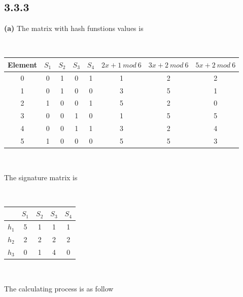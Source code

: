 \documentclass[a4paper, 11pt]{article}
\begin{document}
\subsection*{3.3.3}

\textbf{(a)} The matrix with hash funstions values is

\

\begin{tabular}{c|c|c|c|c|c|c|c} 
Element & $S_1$ & $S_2$ & $S_3$ & $S_4$ & $2x + 1 \ mod \ 6$ & $3x + 2 \ mod \ 6$ & $5x + 2 \ mod \ 6$ \\ 
\hline 
0 & 0 & 1 & 0 & 1 & 1 & 2 & 2 \\ 
1 & 0 & 1 & 0 & 0 & 3 & 5 & 1 \\ 
2 & 1 & 0 & 0 & 1 & 5 & 2 & 0 \\ 
3 & 0 & 0 & 1 & 0 & 1 & 5 & 5 \\ 
4 & 0 & 0 & 1 & 1 & 3 & 2 & 4 \\ 
5 & 1 & 0 & 0 & 0 & 5 & 5 & 3 \\
\end{tabular} 

\

The signature matrix is

\

\begin{tabular}{c|c|c|c|c} 
\ & $S_1$ & $S_2$ & $S_3$ & $S_4$ \\ 
\hline 
$h_1$ & 5 & 1 & 1 & 1  \\ 
$h_2$ & 2 & 2 & 2 & 2 \\
$h_3$ & 0 & 1 & 4 & 0 \\
\end{tabular} 

\

The calculating process is as follow

\
\end{document}
